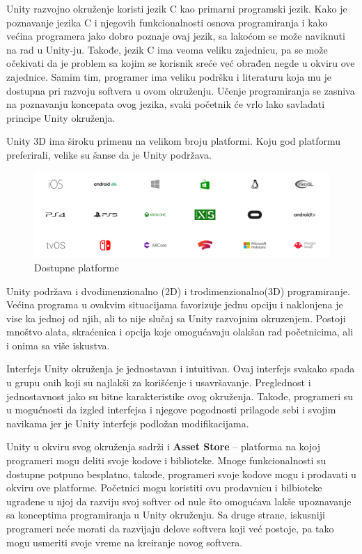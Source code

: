 \documentclass[12pt]{article}
\begin{document}
Unity razvojno okruženje koristi jezik C kao primarni programski jezik.
Kako je poznavanje jezika C i njegovih funkcionalnosti osnova programiranja i kako većina programera jako dobro poznaje ovaj jezik, sa lakoćom se može naviknuti na rad u Unity-ju. Takođe, jezik C ima veoma veliku zajednicu, pa se može očekivati da je problem sa kojim se korisnik sreće već obrađen negde u okviru ove zajednice. Samim tim, programer ima veliku podršku i literaturu koja mu je dostupna pri razvoju softvera u ovom okruženju. Učenje programiranja se zasniva na poznavanju koncepata ovog jezika, svaki početnik će vrlo lako savladati principe Unity okruženja. 

Unity 3D ima široku primenu na velikom broju platformi.
Koju god platformu preferirali, velike su šanse da je Unity podržava.

\begin{figure}[ht!]
    \centering
    \includegraphics[scale=0.2]{platforme.png}
    \caption{Dostupne platforme}
\end{figure}


Unity podržava i dvodimenzionalno (2D) i trodimenzionalno(3D) programiranje. Većina programa u ovakvim situacijama favorizuje jednu opciju i naklonjena je vise ka jednoj od njih, ali to nije slučaj sa Unity razvojnim okruzenjem. Postoji mnoštvo alata, skraćenica i opcija koje omogućavaju olakšan rad početnicima, ali i onima sa više iskustva. 

Interfejs Unity okruženja je jednostavan i intuitivan. 
Ovaj interfejs svakako spada u grupu onih koji su najlakši za korišćenje i usavršavanje. Preglednost i jednostavnost jako su bitne karakteristike
ovog okruženja. Takođe, programeri su u mogućnosti da izgled interfejsa i njegove pogodnosti prilagode sebi i svojim navikama jer je Unity interfejs
podložan modifikacijama. 

Unity u okviru svog okruženja sadrži i \textbf{Asset Store} – platforma na kojoj programeri mogu deliti svoje kodove i biblioteke. Mnoge funkcionalnosti su dostupne potpuno besplatno, takođe, programeri svoje kodove mogu i prodavati u okviru ove platforme. Početnici mogu koristiti ovu prodavnicu i bilbioteke ugrađene u njoj da razviju svoj softver od nule što omogućava lakše upoznavanje sa konceptima programiranja u Unity okruženju.
Sa druge strane, iskusniji programeri neće morati da razvijaju delove softvera koji već postoje, pa tako mogu usmeriti svoje vreme na kreiranje novog softvera.
\end{document}
